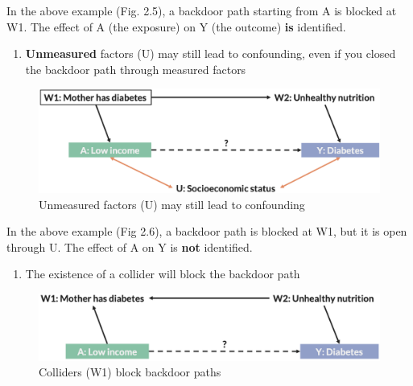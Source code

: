 \documentclass[
]{book}
\providecommand{\tightlist}{%
  \setlength{\itemsep}{0pt}\setlength{\parskip}{0pt}}
\begin{document}
In the above example (Fig. 2.5), a backdoor path starting from A is blocked at W1. The effect of A (the exposure) on Y (the outcome) \textbf{is} identified.

\begin{enumerate}
\def\labelenumi{\arabic{enumi}.}
\setcounter{enumi}{2}
\tightlist
\item
  \textbf{Unmeasured} factors (U) may still lead to confounding, even if you closed the backdoor path through measured factors
\end{enumerate}

\begin{figure}

{\centering \includegraphics[width=1\linewidth]{img/confounding/dag_rules_3} 

}

\caption{Unmeasured factors (U) may still lead to confounding}\label{fig:unnamed-chunk-17}
\end{figure}

In the above example (Fig 2.6), a backdoor path is blocked at W1, but it is open through U. The effect of A on Y is \textbf{not} identified.

\begin{enumerate}
\def\labelenumi{\arabic{enumi}.}
\setcounter{enumi}{3}
\tightlist
\item
  The existence of a collider will block the backdoor path
\end{enumerate}

\begin{figure}

{\centering \includegraphics[width=1\linewidth]{img/confounding/dag_rules_4} 

}

\caption{Colliders (W1) block backdoor paths}\label{fig:unnamed-chunk-18}
\end{figure}
\end{document}
